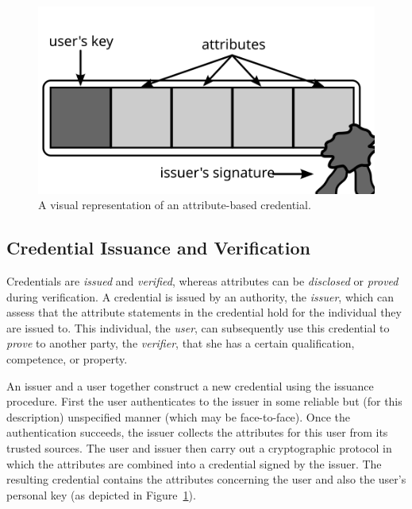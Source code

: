 \begin{figure}[ht]
  \centering
  \includegraphics[scale=.5]{images/credential}
  \caption{A visual representation of an attribute-based credential.}
  \label{fig:Credential}
\end{figure}

\subsection{Credential Issuance and Verification}

Credentials are \emph{issued} and \emph{verified}, whereas attributes can be
\emph{disclosed} or \emph{proved} during verification. A credential is issued
by an authority, the \emph{issuer}, which can assess that the
attribute statements in the credential hold for the
individual they are issued to. This individual, the \emph{user}, can
subsequently use this credential to \emph{prove} to another party, the
\emph{verifier}, that she has a certain qualification,
competence, or property.

An issuer and a user together construct a new credential using the issuance
procedure. First the user authenticates
 to the issuer in some reliable but (for this
description) unspecified manner (which may be face-to-face). Once the
authentication succeeds, the issuer collects the
attributes for this user from its trusted sources. The user
and issuer then carry out a cryptographic protocol in which the attributes
are combined into a credential signed by the issuer. The resulting credential
contains the attributes concerning the user and also the user's personal key (as
depicted in Figure~\ref{fig:Credential}).

